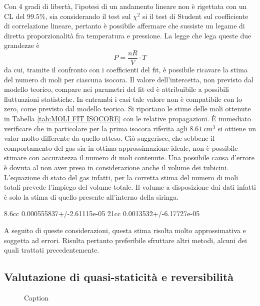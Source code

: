 \documentclass[a4paper,11pt,oneside]{article}
\begin{document}
Con 4 gradi di libertà, l'ipotesi di un andamento lineare non è rigettata con un CL del $99.5\%$, sia considerando il test sul $\chi^{2}$ si il test di Student sul coefficiente di correlazione lineare, pertanto è possibile  affermare che sussiste un legame di diretta proporzionalità fra temperatura e pressione.
La legge che lega queste due grandezze è
\begin{equation*}
    P=\frac{nR}{V}\cdot T
\end{equation*}
da cui, tramite il confronto con i coefficienti del fit, è possibile ricavare la stima del numero di moli per ciascuna isocora. Il valore dell'intercetta, non previsto dal modello teorico, compare nei parametri del fit ed è attribuibile a possibili fluttuazioni statistiche. In entrambi i casi tale valore non è compatibile con lo zero, come previsto dal modello teorico.
Si riportano le stime delle moli ottenute in Tabella \ref{tab:MOLI FIT ISOCORE} con le relative propagazioni. È immediato verificare che in particolare per la prima isocora riferita agli $\SI{8.61}{\centi\meter\cubed}$ si ottiene un valor molto differente da quello atteso. Ciò suggerisce, che sebbene il comportamento del gas sia in ottima approssimazione ideale, non è possibile stimare con accuratezza il numero di moli contenute. Una possibile causa d'errore è dovuta al non aver preso in considerazione anche il volume dei tubicini. L'equazione di stato del gas infatti, per la corretta stima del numero di moli totali prevede l'impiego del volume totale. Il volume a disposizione dai dati infatti è solo la stima di quello presente all'interno della siringa.

8.6cc 0.000555837+/-2.61115e-05
21cc  0.0013532+/-6.17727e-05

A seguito di queste considerazioni, questa stima risolta molto approssimativa e soggetta ad errori. Risulta pertanto preferibile sfruttare altri metodi, alcuni dei quali trattati precedentemente.

\subsection{Valutazione di quasi-staticità e reversibilità}

\begin{figure}[h!]
    \centering
    \caption{Caption}
    \label{fig:my_label}
\end{figure}
\end{document}

